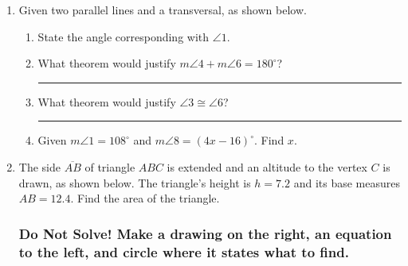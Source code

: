 \documentclass[12pt, twoside]{article}
\begin{document}
\begin{enumerate}
  \item Given two parallel lines and a transversal, as shown below.
  \begin{center}
  \end{center}
  \begin{enumerate}
    \item State the angle corresponding with $\angle 1$. \vspace{0.5cm}
    \item What theorem would justify $m\angle 4 + m\angle 6 =180^\circ$? \rule{5cm}{0.15mm} \vspace{0.5cm}
    \item What theorem would justify $\angle 3 \cong \angle 6$? \rule{7cm}{0.15mm} \vspace{0.5cm}
    \item Given $m\angle 1 = 108^\circ$ and $m\angle 8 = (4x-16)^\circ$. Find $x$. \vspace{4.5cm}
  \end{enumerate}

  \item The side $\overline{AB}$ of triangle $ABC$ is extended and an altitude to the vertex $C$ is drawn, as shown below. The triangle's height is $h=7.2$ and its base measures $AB=12.4$. Find the area of the triangle.
    \begin{flushright}
    \end{flushright}

\newpage
\subsubsection*{Do Not Solve! Make a drawing on the right, an equation to the left, and circle where it states what to find.}
\vspace{0.5cm}


\end{enumerate}
\end{document}
